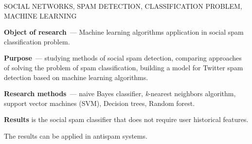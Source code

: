 \pagebreak


\begin{abstract:en}

SOCIAL NETWORKS, SPAM DETECTION, CLASSIFICATION PROBLEM, MACHINE LEARNING

\textbf{Object of research}~--- Machine learning algorithms application in social spam classification problem.

\textbf{Purpose}~--- studying methods of social spam detection, comparing approaches of solving the problem of spam classification, building a model for Twitter spam detection based on machine learning algorithms.

\textbf{Research methods}~--- naive Bayes classifier, \textit{k}-nearest neighbors algorithm, support vector machines (SVM), Decision trees, Random forest.

\textbf{Results} is the social spam classifier that does not require user historical features.

The results can be applied in antispam systems.
\end{abstract:en}
